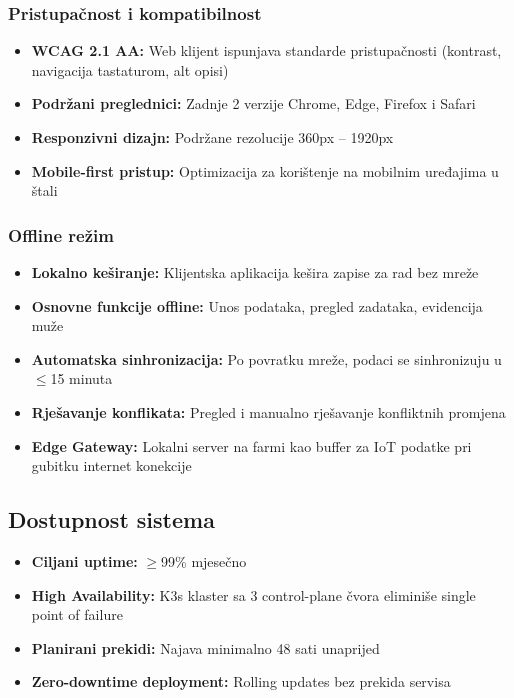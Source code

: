 \documentclass{article}
\begin{document}
\subsubsection{Pristupačnost i kompatibilnost}

\begin{itemize}
    \item \textbf{WCAG 2.1 AA:} Web klijent ispunjava standarde pristupačnosti (kontrast, navigacija tastaturom, alt opisi)
    \item \textbf{Podržani preglednici:} Zadnje 2 verzije Chrome, Edge, Firefox i Safari
    \item \textbf{Responzivni dizajn:} Podržane rezolucije 360px -- 1920px
    \item \textbf{Mobile-first pristup:} Optimizacija za korištenje na mobilnim uređajima u štali
\end{itemize}

\subsubsection{Offline režim}

\begin{itemize}
    \item \textbf{Lokalno keširanje:} Klijentska aplikacija kešira zapise za rad bez mreže
    \item \textbf{Osnovne funkcije offline:} Unos podataka, pregled zadataka, evidencija muže
    \item \textbf{Automatska sinhronizacija:} Po povratku mreže, podaci se sinhronizuju u $\leq$15 minuta
    \item \textbf{Rješavanje konflikata:} Pregled i manualno rješavanje konfliktnih promjena
    \item \textbf{Edge Gateway:} Lokalni server na farmi kao buffer za IoT podatke pri gubitku internet konekcije
\end{itemize}

\subsection{Dostupnost sistema}

\begin{itemize}
    \item \textbf{Ciljani uptime:} $\geq$99\% mjesečno
    \item \textbf{High Availability:} K3s klaster sa 3 control-plane čvora eliminiše single point of failure
    \item \textbf{Planirani prekidi:} Najava minimalno 48 sati unaprijed
    \item \textbf{Zero-downtime deployment:} Rolling updates bez prekida servisa
\end{itemize}
\end{document}
